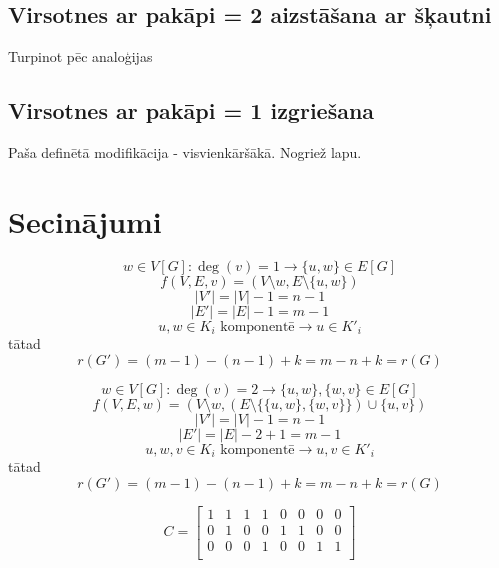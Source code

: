 \documentclass[12pt, a4paper]{article}
\begin{document}
\subsection{Virsotnes ar pakāpi = 2 aizstāšana ar šķautni}
Turpinot pēc analoģijas

\newpage
\subsection{Virsotnes ar pakāpi = 1 izgriešana}
Paša definētā modifikācija - visvienkāršākā. Nogriež lapu.



\newpage
\section{Secinājumi}

\begin{equation}
    w \in V[G] : \deg(v) = 1 \rightarrow \lbrace u,w \rbrace \in E[G]
\end{equation}
\begin{equation}
    f(V,E,v) = (V \setminus w, E \setminus \lbrace u,w \rbrace)
\end{equation}
\begin{equation}
    \vert V' \vert = \vert V \vert - 1 = n - 1
\end{equation}
\begin{equation}
    \vert E' \vert = \vert E \vert - 1 = m - 1
\end{equation}
\begin{equation}
    u,w \in K_i \text{ komponentē} \rightarrow u \in K'_i
\end{equation}
tātad
\begin{equation}
    r(G') = (m-1)-(n-1)+k = m-n+k = r(G)
\end{equation}


\begin{equation}
    w \in V[G] : \deg(v) = 2 \rightarrow \lbrace u,w \rbrace, \lbrace w,v \rbrace \in E[G]
\end{equation}
\begin{equation}
    f(V,E,w) = (V \setminus w, (E \setminus \lbrace \lbrace u,w \rbrace, \lbrace w,v\rbrace  \rbrace) \cup \lbrace u,v \rbrace)
\end{equation}
\begin{equation}
    \vert V' \vert = \vert V \vert - 1 = n - 1
\end{equation}
\begin{equation}
    \vert E' \vert = \vert E \vert - 2 + 1 = m - 1
\end{equation}
\begin{equation}
    u,w,v \in K_i \text{ komponentē} \rightarrow u,v \in K'_i
\end{equation}
tātad
\begin{equation}
    r(G') = (m-1)-(n-1)+k = m-n+k = r(G)
\end{equation}

$$ 
C=\begin{bmatrix}
    1 & 1 & 1 & 1 & 0 & 0 & 0 & 0 \\
    0 & 1 & 0 & 0 & 1 & 1 & 0 & 0 \\
    0 & 0 & 0 & 1 & 0 & 0 & 1 & 1 \\
    
\end{bmatrix}
$$
\end{document}
